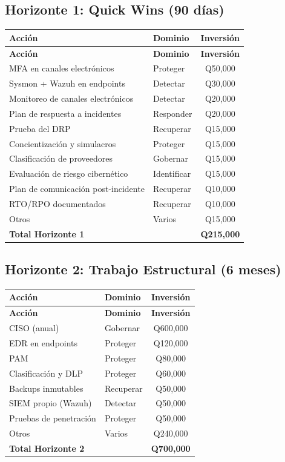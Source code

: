 \documentclass[11pt,a4paper]{article}
\begin{document}
	\subsection{Horizonte 1: Quick Wins (90 días)}
	
	\begin{longtable}{@{}p{7cm}p{3cm}c@{}}
		\toprule
		\textbf{Acción} & \textbf{Dominio} & \textbf{Inversión} \\ \midrule
		\endfirsthead
		\toprule
		\textbf{Acción} & \textbf{Dominio} & \textbf{Inversión} \\ \midrule
		\endhead
		MFA en canales electrónicos & Proteger & Q50,000 \\
		Sysmon + Wazuh en endpoints & Detectar & Q30,000 \\
		Monitoreo de canales electrónicos & Detectar & Q20,000 \\
		Plan de respuesta a incidentes & Responder & Q20,000 \\
		Prueba del DRP & Recuperar & Q15,000 \\
		Concientización y simulacros & Proteger & Q15,000 \\
		Clasificación de proveedores & Gobernar & Q15,000 \\
		Evaluación de riesgo cibernético & Identificar & Q15,000 \\
		Plan de comunicación post-incidente & Recuperar & Q10,000 \\
		RTO/RPO documentados & Recuperar & Q10,000 \\
		Otros & Varios & Q15,000 \\ \midrule
		\textbf{Total Horizonte 1} & & \textbf{Q215,000} \\ \bottomrule
	\end{longtable}
	
	\newpage
	
	\subsection{Horizonte 2: Trabajo Estructural (6 meses)}
	
	\begin{longtable}{@{}p{6cm}p{4cm}c@{}}
		\toprule
		\textbf{Acción} & \textbf{Dominio} & \textbf{Inversión} \\ \midrule
		\endfirsthead
		\toprule
		\textbf{Acción} & \textbf{Dominio} & \textbf{Inversión} \\ \midrule
		\endhead
		CISO (anual) & Gobernar & Q600,000 \\
		EDR en endpoints & Proteger & Q120,000 \\
		PAM & Proteger & Q80,000 \\
		Clasificación y DLP & Proteger & Q60,000 \\
		Backups inmutables & Recuperar & Q50,000 \\
		SIEM propio (Wazuh) & Detectar & Q50,000 \\
		Pruebas de penetración & Proteger & Q50,000 \\
		Otros & Varios & Q240,000 \\ \midrule
		\textbf{Total Horizonte 2} & & \textbf{Q700,000} \\ \bottomrule
	\end{longtable}
	
\end{document}
